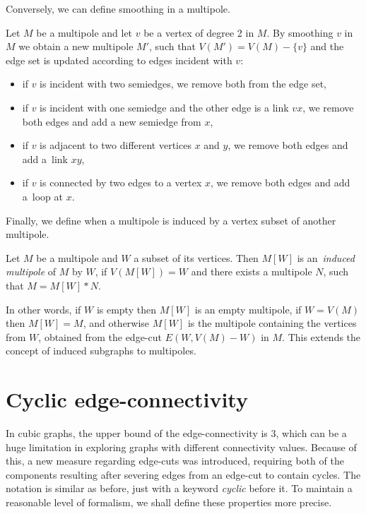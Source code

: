 \documentclass[12pt, twoside]{book}
\begin{document}
Conversely, we can define smoothing in a multipole.
\begin{definition}
	Let $M$ be a multipole and let $v$ be a vertex of degree 2 in $M$. By smoothing $v$ in $M$ we obtain a new multipole $M'$, such that $V(M')=V(M)-\{v\}$ and the edge set is updated according to edges incident with $v$:
	\begin{itemize}
		\item if $v$ is incident with two semiedges, we remove both from the edge set,
		\item if $v$ is incident with one semiedge and the other edge is a link $vx$, we remove both edges and add a new semiedge from $x$,
		\item if $v$ is adjacent to two different vertices $x$ and $y$, we remove both edges and add a~link $xy$,
		\item if $v$ is connected by two edges to a vertex $x$, we remove both edges and add a~loop at $x$.
	\end{itemize}
\end{definition}

Finally, we define when a multipole is induced by a vertex subset of another multipole.
\begin{definition}
	Let $M$ be a multipole and $W$ a subset of its vertices. Then $M[W]$ is an~\textit{induced multipole} of $M$ by $W$, if $V(M[W])=W$ and there exists a multipole $N$, such that $M=M[W]*N$.
\end{definition}

In other words, if $W$ is empty then $M[W]$ is an empty multipole, if $W=V(M)$ then $M[W]=M$, and otherwise $M[W]$ is the multipole containing the vertices from $W$, obtained from the edge-cut $E\left(W,V(M)-W\right)$ in $M$. This extends the concept of induced subgraphs to multipoles.

\section{Cyclic edge-connectivity}\label{sec:cyclic-edge-connectivity}

In cubic graphs, the upper bound of the edge-connectivity is 3, which can be a huge limitation in exploring graphs with different connectivity values. Because of this, a new measure regarding edge-cuts was introduced, requiring both of the components resulting after severing edges from an edge-cut to contain cycles. The notation is similar as before, just with a keyword \textit{cyclic} before it. To maintain a reasonable level of formalism, we shall define these properties more precise.
\end{document}
